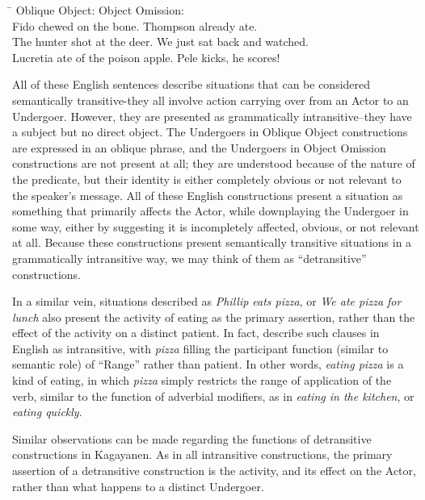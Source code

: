 \ea
\label{bkm:Ref117062761}
\begin{tabbing}
\hspace{5.2cm} \= \kill
Oblique Object:   \>   Object Omission: \\
Fido chewed on the bone. \>     Thompson already ate. \\
The hunter shot at the deer. \>     We just sat back and watched. \\
Lucretia ate of the poison apple. \>   Pele kicks, he scores!
\end{tabbing}
\z
All of these English sentences describe situations that can be considered semantically transitive-they all involve action carrying over from an Actor to an Undergoer. However, they are presented as grammatically intransitive--they have a subject but no direct object. The Undergoers in Oblique Object constructions are expressed in an oblique phrase, and the Undergoers in Object Omission constructions are not present at all; they are understood because of the nature of the predicate, but their identity is either completely obvious or not relevant to the speaker’s message. All of these English constructions present a situation as something that primarily affects the Actor, while downplaying the Undergoer in some way, either by suggesting it is incompletely affected, obvious, or not relevant at all. Because these constructions present semantically transitive situations in a grammatically intransitive way, we may think of them as “detransitive” constructions.

In a similar vein, situations described as \textit{Phillip eats pizza}, or \textit{We ate pizza for lunch} also present the activity of eating as the primary assertion, rather than the effect of the activity on a distinct patient. In fact, \citet[293]{halliday2014} describe such clauses in English as intransitive, with \textit{pizza} filling the participant function (similar to semantic role) of “Range” rather than patient. In other words, \textit{eating pizza} is a kind of eating, in which \textit{pizza} simply restricts the range of application of the verb, similar to the function of adverbial modifiers, as in \textit{eating in the kitchen}, or \textit{eating quickly}. 

Similar observations can be made regarding the functions of detransitive constructions in Kagayanen. As in all intransitive constructions, the primary assertion of a detransitive construction is the activity, and its effect on the Actor, rather than what happens to a distinct Undergoer.

